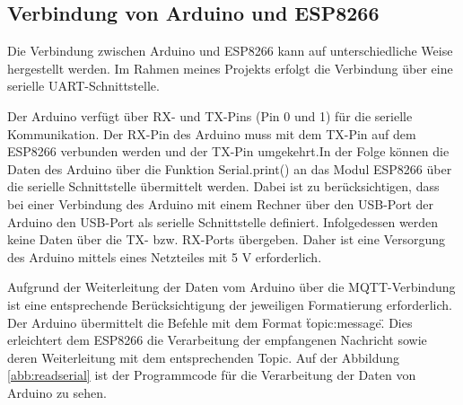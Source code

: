 \documentclass[12pt, letterpaper]{article}
\begin{document}
\subsection[Arduino-ESP8266]{Verbindung von Arduino und ESP8266}
\par Die Verbindung zwischen Arduino und ESP8266 kann auf unterschiedliche Weise hergestellt werden. Im Rahmen meines Projekts erfolgt die Verbindung über eine serielle UART-Schnittstelle.
\par Der Arduino verfügt über RX- und TX-Pins (Pin 0 und 1) für die serielle Kommunikation. Der RX-Pin des Arduino muss mit dem TX-Pin auf dem ESP8266 verbunden werden und der TX-Pin umgekehrt.In der Folge können die Daten des Arduino über die Funktion Serial.print() an das Modul ESP8266 über die serielle Schnittstelle übermittelt werden. Dabei ist zu berücksichtigen, dass bei einer Verbindung des Arduino mit einem Rechner über den USB-Port der Arduino den USB-Port als serielle Schnittstelle definiert. Infolgedessen werden keine Daten über die TX- bzw. RX-Ports übergeben. Daher ist eine Versorgung des Arduino mittels eines Netzteiles mit 5 V erforderlich.
\par Aufgrund der Weiterleitung der Daten vom Arduino über die MQTT-Verbindung ist eine entsprechende Berücksichtigung der jeweiligen Formatierung erforderlich. Der Arduino übermittelt die Befehle mit dem Format \"topic:message\". Dies erleichtert dem ESP8266 die Verarbeitung der empfangenen Nachricht sowie deren Weiterleitung mit dem entsprechenden Topic. Auf der Abbildung \ref{abb:readserial} ist der Programmcode für die Verarbeitung der Daten von Arduino zu sehen. 
\end{document}
